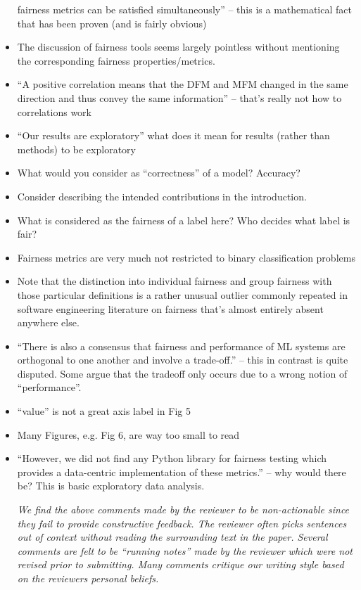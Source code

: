 \documentclass[conference,review,anonymous]{IEEEtran}
\newcommand{\highlight}[1]{\begin{framed}%
  \noindent\emph{#1}
\end{framed}}
\begin{document}
\begin{itemize}
    fairness metrics can be satisfied simultaneously'' -- this is
    a mathematical fact that has been proven (and is fairly obvious)
  \item The discussion of fairness tools seems largely pointless
    without mentioning the corresponding fairness properties/metrics.
  \item ``A positive correlation means that the DFM and MFM changed in
    the same direction and thus convey the same information'' --
    that’s really not how to correlations work
  \item ``Our results are exploratory'' what does it mean for results
    (rather than methods) to be exploratory
  \item What would you consider as ``correctness'' of a model?
    Accuracy?
  \item Consider describing the intended contributions in the
    introduction.
  \item What is considered as the fairness of a label here? Who
    decides what label is fair?
  \item Fairness metrics are very much not restricted to binary
    classification problems
  \item Note that the distinction into individual fairness and group
    fairness with those particular definitions is a rather unusual
    outlier commonly repeated in software engineering literature on
    fairness that’s almost entirely absent anywhere else.
  \item ``There is also a consensus that fairness and performance of
    ML systems are orthogonal to one another and involve
    a trade-off.'' -- this in contrast is quite disputed. Some argue
    that the tradeoff only occurs due to a wrong notion of
    ``performance''.
  \item ``value'' is not a great axis label in Fig 5
  \item Many Figures, e.g. Fig 6, are way too small to read
  \item ``However, we did not find any Python library for fairness
    testing which provides a data-centric implementation of these
    metrics.'' -- why would there be? This is basic exploratory data
    analysis.

    \highlight{We find the above comments made by the reviewer to be
    non-actionable since they fail to provide constructive
    feedback. The reviewer often picks sentences out of context
    without reading the surrounding text in the paper. Several
    comments are felt to be ``running notes'' made by the reviewer
    which were not revised prior to submitting. Many comments critique
    our writing style based on the reviewers personal beliefs.}


\end{itemize}
\end{document}
